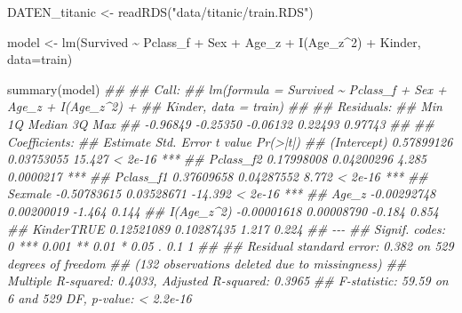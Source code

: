 \documentclass[
  10pt,
  letterpaper,
  a4paper, twoside]{scrreprt}
\newenvironment{Shaded}{\begin{snugshade}}{\end{snugshade}}
\newcommand{\AttributeTok}[1]{\textcolor[rgb]{0.40,0.45,0.13}{#1}}
\newcommand{\DecValTok}[1]{\textcolor[rgb]{0.68,0.00,0.00}{#1}}
\newcommand{\DocumentationTok}[1]{\textcolor[rgb]{0.37,0.37,0.37}{\textit{#1}}}
\newcommand{\FunctionTok}[1]{\textcolor[rgb]{0.28,0.35,0.67}{#1}}
\newcommand{\NormalTok}[1]{\textcolor[rgb]{0.00,0.23,0.31}{#1}}
\newcommand{\OtherTok}[1]{\textcolor[rgb]{0.00,0.23,0.31}{#1}}
\newcommand{\SpecialCharTok}[1]{\textcolor[rgb]{0.37,0.37,0.37}{#1}}
\newcommand{\StringTok}[1]{\textcolor[rgb]{0.13,0.47,0.30}{#1}}
\begin{document}
\begin{Shaded}
\begin{Highlighting}[]

\NormalTok{DATEN\_titanic }\OtherTok{\textless{}{-}} \FunctionTok{readRDS}\NormalTok{(}\StringTok{"data/titanic/train.RDS"}\NormalTok{)}

\NormalTok{model }\OtherTok{\textless{}{-}} \FunctionTok{lm}\NormalTok{(Survived }\SpecialCharTok{\textasciitilde{}}\NormalTok{ Pclass\_f }\SpecialCharTok{+}\NormalTok{ Sex }\SpecialCharTok{+}\NormalTok{ Age\_z }\SpecialCharTok{+} \FunctionTok{I}\NormalTok{(Age\_z}\SpecialCharTok{\^{}}\DecValTok{2}\NormalTok{) }\SpecialCharTok{+}\NormalTok{ Kinder, }
            \AttributeTok{data=}\NormalTok{train)}

\FunctionTok{summary}\NormalTok{(model)}
\DocumentationTok{\#\# }
\DocumentationTok{\#\# Call:}
\DocumentationTok{\#\# lm(formula = Survived \textasciitilde{} Pclass\_f + Sex + Age\_z + I(Age\_z\^{}2) + }
\DocumentationTok{\#\#     Kinder, data = train)}
\DocumentationTok{\#\# }
\DocumentationTok{\#\# Residuals:}
\DocumentationTok{\#\#      Min       1Q   Median       3Q      Max }
\DocumentationTok{\#\# {-}0.96849 {-}0.25350 {-}0.06132  0.22493  0.97743 }
\DocumentationTok{\#\# }
\DocumentationTok{\#\# Coefficients:}
\DocumentationTok{\#\#                Estimate  Std. Error t value  Pr(\textgreater{}|t|)    }
\DocumentationTok{\#\# (Intercept)  0.57899126  0.03753055  15.427   \textless{} 2e{-}16 ***}
\DocumentationTok{\#\# Pclass\_f2    0.17998008  0.04200296   4.285 0.0000217 ***}
\DocumentationTok{\#\# Pclass\_f1    0.37609658  0.04287552   8.772   \textless{} 2e{-}16 ***}
\DocumentationTok{\#\# Sexmale     {-}0.50783615  0.03528671 {-}14.392   \textless{} 2e{-}16 ***}
\DocumentationTok{\#\# Age\_z       {-}0.00292748  0.00200019  {-}1.464     0.144    }
\DocumentationTok{\#\# I(Age\_z\^{}2)  {-}0.00001618  0.00008790  {-}0.184     0.854    }
\DocumentationTok{\#\# KinderTRUE   0.12521089  0.10287435   1.217     0.224    }
\DocumentationTok{\#\# {-}{-}{-}}
\DocumentationTok{\#\# Signif. codes:  0 \textquotesingle{}***\textquotesingle{} 0.001 \textquotesingle{}**\textquotesingle{} 0.01 \textquotesingle{}*\textquotesingle{} 0.05 \textquotesingle{}.\textquotesingle{} 0.1 \textquotesingle{} \textquotesingle{} 1}
\DocumentationTok{\#\# }
\DocumentationTok{\#\# Residual standard error: 0.382 on 529 degrees of freedom}
\DocumentationTok{\#\#   (132 observations deleted due to missingness)}
\DocumentationTok{\#\# Multiple R{-}squared:  0.4033, Adjusted R{-}squared:  0.3965 }
\DocumentationTok{\#\# F{-}statistic: 59.59 on 6 and 529 DF,  p{-}value: \textless{} 2.2e{-}16}
\end{Highlighting}
\end{Shaded}
\end{document}
